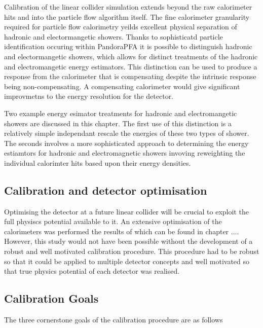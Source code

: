 Calibration of the linear collider simulation extends beyond the raw calorimeter hits and into the particle flow algorithm itself.  The fine calorimeter granularity required for particle flow calorimetry yeilds excellent physical separation of hadronic and electormangetic showers.  Thanks to sophisticatd particle identification occuring within PandoraPFA it is possible to distinguish hadronic and electormangetic showers, which allows for distinct treatments of the hadronic and electromangetic energy estimators.  This distinction can be used to produce a response from the calorimeter that is compensating despite the intrinsic response being non-compensating.  A compensating calorimeter would give significant improvmetns to the energy resolution for the detector.

Two example energy esimator treatments for hadronic and electromangetic showers are discussed in this chapter.  The first use of this distinction is a relatively simple independant rescale the energies of these two types of shower.  The seconds involves a more sophisticated approach to determining the energy estiamtors for hadronic and electromagnetic showers invoving reweighting the individual calorimter hits based upon their energy densities.

\subsection{Calibration and detector optimisation}


Optimising the detector at a future linear collider will be crucial to exploit the full physiscs potential available to it.  An extensive optimisation of the calorimeters was performed the results of which can be found in chapter ....  However, this study would not have been possible without the development of a robust and well motivated calibration procedure.  This procedure had to be robust so that it could be applied to multiple detector concepts and well motivated so that true physics potential of each detector was realised.

\subsection{Calibration Goals}

The three cornerstone goals of the calibration procedure are as follows

